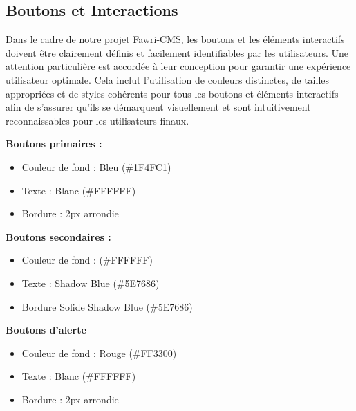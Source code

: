 \subsection{Boutons et Interactions}
\hspace{\parindent}Dans le cadre de notre projet Fawri-CMS, les boutons et les éléments interactifs doivent être clairement définis et facilement identifiables par les utilisateurs. Une attention particulière est accordée à leur conception pour garantir une expérience utilisateur optimale. Cela inclut l'utilisation de couleurs distinctes, de tailles appropriées et de styles cohérents pour tous les boutons et éléments interactifs afin de s'assurer qu'ils se démarquent visuellement et sont intuitivement reconnaissables pour les utilisateurs finaux.

\textbf{Boutons primaires :}
\begin{itemize}
  \item Couleur de fond : Bleu (\#1F4FC1)

  \item Texte : Blanc (\#FFFFFF)

  \item Bordure : 2px arrondie
\end{itemize}

\textbf{Boutons secondaires :}
\begin{itemize}
  \item Couleur de fond : (\#FFFFFF)

  \item Texte : Shadow Blue (\#5E7686)

  \item Bordure Solide Shadow Blue (\#5E7686)
\end{itemize}

\textbf{Boutons d'alerte}
\begin{itemize}
  \item Couleur de fond : Rouge (\#FF3300)

  \item Texte : Blanc (\#FFFFFF)

  \item Bordure : 2px arrondie
\end{itemize}










